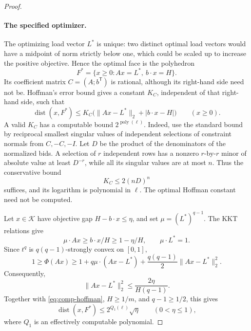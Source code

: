 \documentclass[11pt]{article}
\begin{document}
\begin{proof}
\paragraph{The specified optimizer.}
The optimizing load vector $L^*$ is unique:
two distinct optimal load vectors would have a midpoint of
norm strictly below one, which could be scaled up to increase
the positive objective.
Hence the optimal face is the polyhedron
\[
F^*=\{x\ge0:Ax=L^*,\ b\cdot x=H\}.
\]
Its coefficient matrix $C=(A;b^{\mathsf T})$ is rational,
although its right-hand side need not be.
Hoffman's error bound \cite{compHoffman1952} gives a constant
$K_C$, independent of that right-hand side, such that
\begin{equation}
\label{eq:comp-hoffman}
\operatorname{dist}(x,F^*)
\le
K_C\bigl(\|Ax-L^*\|_2+|b\cdot x-H|\bigr)
\qquad(x\ge0).
\end{equation}
A valid $K_C$ has a computable bound
$2^{\operatorname{poly}(\ell)}$.
Indeed, use the standard bound by reciprocal smallest singular
values of independent selections of constraint normals from
$C,-C,-I$.
Let $D$ be the product of the denominators of the normalized
bids.
A selection of $r$ independent rows has a nonzero
$r$-by-$r$ minor of absolute value at least $D^{-r}$,
while all its singular values are at most $n$.
Thus the conservative bound
\[
K_C\le2(nD)^n
\]
suffices, and its logarithm is polynomial in $\ell$.
The optimal Hoffman constant need not be computed.

Let $x\in\mathcal K$ have objective gap
$H-b\cdot x\le\eta$, and set $\mu=(L^*)^{q-1}$.
The KKT relations give
\[
\mu\cdot Ax
\ge b\cdot x/H
\ge1-\eta/H,
\qquad
\mu\cdot L^*=1.
\]
Since $t^q$ is $q(q-1)$-strongly convex on $[0,1]$,
\[
1\ge\Phi(Ax)
\ge
1+q\mu\cdot(Ax-L^*)
+\frac{q(q-1)}2\|Ax-L^*\|_2^2.
\]
Consequently,
\begin{equation}
\label{eq:comp-load-error}
\|Ax-L^*\|_2^2
\le\frac{2\eta}{H(q-1)}.
\end{equation}
Together with \eqref{eq:comp-hoffman}, $H\ge1/m$, and
$q-1\ge1/2$, this gives
\[
\operatorname{dist}(x,F^*)
\le2^{Q_1(\ell)}\sqrt{\eta}
\qquad(0<\eta\le1),
\]
where $Q_1$ is an effectively computable polynomial.


\end{proof}
\end{document}
